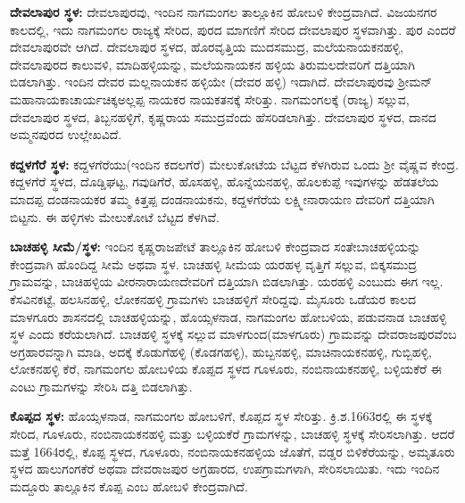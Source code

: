 \textbf{ದೇವಲಾಪುರ ಸ್ಥಳ:} ದೇವಲಾಪುರವು, ಇಂದಿನ ನಾಗಮಂಗಲ ತಾಲ್ಲೂಕಿನ ಹೋಬಳಿ ಕೇಂದ್ರವಾಗಿದೆ. ವಿಜಯನಗರ ಕಾಲದಲ್ಲಿ, ಇದು ನಾಗಮಂಗಲ ರಾಜ್ಯಕ್ಕೆ ಸೇರಿದ, ಪುರದ ಮಾಗಣಿಗೆ ಸೇರಿದ ದೇವಲಾಪುರ ಸ್ಥಳವಾಗಿತ್ತು. ಪುರ ಎಂದರೆ ದೇವಲಾಪುರವೇ ಆಗಿದೆ. ದೇವಲಾಪುರ ಸ್ಥಳದ, ಹೊರವೃತ್ತಿಯ ಮುದಸಮುದ್ರ, ಮಲೆಯನಾಯಕನಹಳ್ಳಿ, ದೇವಲಾಪುರದ ಕಾಲುವಳಿ, ಮಾದಿಹಳ್ಳಿಯನ್ನು, ಮಲೆಯನಾಯಕನ ಹಳ್ಳಿಯ ತಿರುಮಲದೇವರಿಗೆ ದತ್ತಿಯಾಗಿ ಬಿಡಲಾಗಿತ್ತು. ಇಂದಿನ ದೇವರ ಮಲ್ಲನಾಯಕನ ಹಳ್ಳಿಯೇ (ದೇವರ ಹಳ್ಳಿ) ಇದಾಗಿದೆ. ದೇವಲಾಪುರವು ಶ‍್ರೀಮನ್​ಮಹಾನಾಯಕಾಚಾರ್ಯ\break ಚಿಕ್ಕಅಲ್ಲಪ್ಪ ನಾಯಕರ ನಾಯಕತನಕ್ಕೆ ಸೇರಿತ್ತು. ನಾಗಮಂಗಲಕ್ಕೆ (ರಾಜ್ಯ) ಸಲ್ಲುವ, ದೇವಲಾಪುರ ಸ್ಥಳದ, ತಿಬ್ಬನಹಳ್ಳಿಗೆ, ಕೃಷ್ಣರಾಯ ಸಮುದ್ರವೆಂದು ಹೆಸರಿಡಲಾಗಿತ್ತು. ದೇವಲಾಪುರ ಸ್ಥಳದ, ದಾನದ ಅಮ್ಮನಪುರದ ಉಲ್ಲೇಖವಿದೆ.

\textbf{ಕದ್ದಳಗೆರೆ ಸ್ಥಳ:} ಕದ್ದಳಗೆರೆಯು(ಇಂದಿನ ಕದಲಗೆರೆ) ಮೇಲುಕೋಟೆಯ ಬೆಟ್ಟದ ಕೆಳಗಿರುವ ಒಂದು ಶ‍್ರೀ ವೈಷ್ಣವ ಕೇಂದ್ರ. ಕದ್ದಳಗೆರೆ ಸ್ಥಳದ, ದೊಡ್ಡಿಘಟ್ಟ, ಗವುಡಿಗೆರೆ, ಹೊಸಹಳ್ಳಿ, ಹೊನ್ನೆಯನಹಳ್ಳಿ, ಹೊಲಕುಪ್ಪೆ ಇವುಗಳನ್ನು ಹೆಡತಲೆಯ ಮಾದಪ್ಪ ದಂಡನಾಯಕರ ತಮ್ಮ ಕಿತ್ತಪ್ಪ ದಂಡನಾಯಕನು, ಕದ್ದಳಗೆರೆಯ ಲಕ್ಷ್ಮೀನಾರಾಯಣ ದೇವರಿಗೆ ದತ್ತಿಯಾಗಿ ಬಿಟ್ಟನು. ಈ ಹಳ್ಳಿಗಳು ಮೇಲುಕೋಟೆ ಬೆಟ್ಟದ ಕೆಳಗಿವೆ.

\textbf{ಬಾಚಹಳ್ಳಿ ಸೀಮೆ/ಸ್ಥಳ:} ಇಂದಿನ ಕೃಷ್ಣರಾಜಪೇಟೆ ತಾಲ್ಲೂಕಿನ ಹೋಬಳಿ ಕೇಂದ್ರವಾದ ಸಂತೇಬಾಚಹಳ್ಳಿಯನ್ನು ಕೇಂದ್ರವಾಗಿ ಹೊಂದಿದ್ದ ಸೀಮೆ ಅಥವಾ ಸ್ಥಳ. ಬಾಚಹಳ್ಳಿ ಸೀಮೆಯ ಯರಹಳ್ಳ ವೃತ್ತಿಗೆ ಸಲ್ಲುವ, ಬಿಕ್ಕಸಮುದ್ರ ಗ್ರಾಮವನ್ನು, ಬಾಚಿಹಳ್ಳಿಯ ವೀರನಾರಾಯಣದೇವರಿಗೆ ದತ್ತಿಯಾಗಿ ಬಿಡಲಾಗಿತ್ತು. ಯರಹಳ್ಳಿ ಎಂಬುದು ಈಗ ಇಲ್ಲ. ಕೆಸವಿನಕಟ್ಟೆ, ಹಲಸಿನಹಳ್ಳಿ, ಲೋಕನಹಳ್ಳಿ ಗ್ರಾಮಗಳು ಬಾಚಹಳ್ಳಿಗೆ ಸೇರಿದ್ದವು. ಮೈಸೂರು ಒಡೆಯರ ಕಾಲದ ಮಾಳಗೂರು ಶಾಸನದಲ್ಲಿ ಬಾಚಹಳ್ಳಿಯನ್ನು, ಹೊಯ್ಸಳನಾಡ, ನಾಗಮಂಗಲ ಹೋಬಳಿಯ, ಪಡುವನಾಡ ಬಾಚಹಳ್ಳಿ ಸ್ಥಳ ಎಂದು ಕರೆಯಲಾಗಿದೆ. ಬಾಚಹಳ್ಳಿ ಸ್ಥಳಕ್ಕೆ ಸಲ್ಲುವ ಮಾಳಗುಂದ(ಮಾಳಗೂರು) ಗ್ರಾಮವನ್ನು ದೇವರಾಜಪುರವೆಂಬ ಅಗ್ರಹಾರವನ್ನಾಗಿ ಮಾಡಿ, ಅದಕ್ಕೆ ಕೊಡುಗೆಹಳ್ಳಿ (ಕೊಡಗಹಳ್ಳಿ), ಹುಬ್ಬನಹಳ್ಳಿ, ಮಾಚಿನಾಯಕನಹಳ್ಳಿ, ಗುಬ್ಬಿಹಳ್ಳಿ, ಲೋಕನಹಳ್ಳಿ ಕೆರೆ, ನಾಗಮಂಗಲ ಹೋಬಳಿಯ ಕೊಪ್ಪದ ಸ್ಥಳದ ಗೂಳೂರು, ನಂಬಿನಾಯಕನಹಳ್ಳಿ, ಬಳ್ಳಿಯಕೆರೆ ಈ ಎಂಟು ಗ್ರಾಮಗಳನ್ನು ಸೇರಿಸಿ ದತ್ತಿ ಬಿಡಲಾಗಿತ್ತು.

\textbf{ಕೊಪ್ಪದ ಸ್ಥಳ:} ಹೊಯ್ಸಳನಾಡ, ನಾಗಮಂಗಲ ಹೋಬಳಿಗೆ, ಕೊಪ್ಪದ ಸ್ಥಳ ಸೇರಿತ್ತು. ಕ್ರಿ.ಶ.1663ರಲ್ಲಿ ಈ ಸ್ಥಳಕ್ಕೆ ಸೇರಿದ, ಗೂಳೂರು, ನಂಬಿನಾಯಕನಹಳ್ಳಿ ಮತ್ತು ಬಳ್ಳಿಯಕೆರೆ ಗ್ರಾಮಗಳನ್ನು, ಬಾಚಹಳ್ಳಿ ಸ್ಥಳಕ್ಕೆ ಸೇರಿಸಲಾಗಿತ್ತು. ಆದರೆ ಮತ್ತೆ 1664ರಲ್ಲಿ, ಕೊಪ್ಪ ಸ್ಥಳದ, ಗೂಳೂರು, ನಂಬಿನಾಯಕನಹಳ್ಳಿಯ ಜೊತೆಗೆ, ವಡ್ಡರ ಬಿಳಿಕೆರೆಯನ್ನು, ಅಮೃತೂರು ಸ್ಥಳದ ಹಾಲುಗಂಗಕೆರೆ ಅಥವಾ ದೇವರಾಜಪುರ ಅಗ್ರಹಾರದ, ಉಪಗ್ರಾಮಗಳಾಗಿ, ಸೇರಿಸಲಾಯಿತು. ಇದು ಇಂದಿನ ಮದ್ದೂರು ತಾಲ್ಲೂಕಿನ ಕೊಪ್ಪ ಎಂಬ ಹೋಬಳಿ ಕೇಂದ್ರವಾಗಿದೆ.

